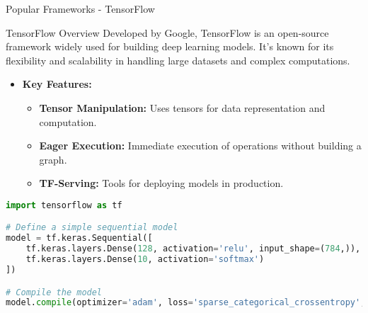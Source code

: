 \documentclass[aspectratio=169]{beamer}
\begin{document}
\begin{frame}{Popular Frameworks - TensorFlow}
    \begin{block}{TensorFlow Overview}
        Developed by Google, TensorFlow is an open-source framework widely used for building deep learning models. 
        It's known for its flexibility and scalability in handling large datasets and complex computations.
    \end{block}
    
    \begin{itemize}
        \item \textbf{Key Features:}
        \begin{itemize}
            \item \textbf{Tensor Manipulation:} Uses tensors for data representation and computation.
            \item \textbf{Eager Execution:} Immediate execution of operations without building a graph.
            \item \textbf{TF-Serving:} Tools for deploying models in production.
        \end{itemize}
    \end{itemize}
    
    \begin{lstlisting}[language=Python]
import tensorflow as tf

# Define a simple sequential model
model = tf.keras.Sequential([
    tf.keras.layers.Dense(128, activation='relu', input_shape=(784,)),
    tf.keras.layers.Dense(10, activation='softmax')
])

# Compile the model
model.compile(optimizer='adam', loss='sparse_categorical_crossentropy', metrics=['accuracy'])
    \end{lstlisting}
\end{frame}
\end{document}
